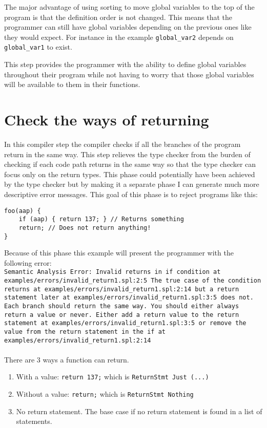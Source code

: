 \documentclass{report}
\begin{document}
\noindent The major advantage of using sorting to move global variables to the top of the program is that the definition order is not changed. This means that the programmer can still have global variables depending on the previous ones like they would expect. For instance in the example \texttt{global\_var2} depends on \texttt{global\_var1} to exist.

This step provides the programmer with the ability to define global variables throughout their program while not having to worry that those global variables will be available to them in their functions.

\section{Check the ways of returning} \label{sec:Check-Returns}

In this compiler step the compiler checks if all the branches of the program return in the same way. This step relieves the type checker from the burden of checking if each code path returns in the same way so that the type checker can focus only on the return types. 
This phase could potentially have been achieved by the type checker but by making it a separate phase I can generate much more descriptive error messages.  
This goal of this phase is to reject programs like this:

\begin{lstlisting}[style=spl]
foo(aap) {
    if (aap) { return 137; } // Returns something
    return; // Does not return anything!
}
\end{lstlisting}

\noindent Because of this phase this example will present the programmer with the following error: \\
\texttt{\textcolor{error}{Semantic Analysis Error: Invalid returns} in if condition at \textcolor{filename}{examples/errors/invalid\_return1.spl:2:5}
The true case of the condition returns at \textcolor{filename}{examples/errors/invalid\_return1.spl:2:14} but a return statement later at \textcolor{filename}{examples/errors/invalid\_return1.spl:3:5} does not.
Each branch should return the same way. You should either always return a value or never.
Either add a return value to the return statement at \textcolor{filename}{examples/errors/invalid\_return1.spl:3:5} or remove the value from the return statement in the if at \textcolor{filename}{examples/errors/invalid\_return1.spl:2:14}}
\\\\
\noindent There are 3 ways a function can return.
\begin{enumerate}
    \item With a value:  \texttt{return 137;} which is \texttt{ReturnStmt Just (...)}
    \item Without a value: \texttt{return;} which is \texttt{ReturnStmt Nothing}
    \item No return statement. The base case if no return statement is found in a list of statements.
\end{enumerate}
\end{document}
